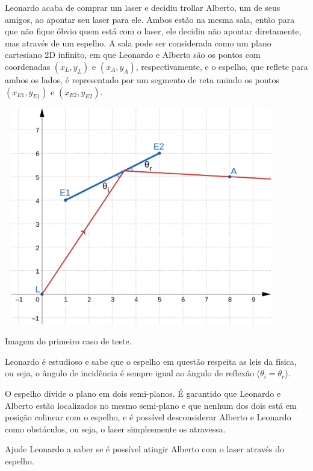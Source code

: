 Leonardo acaba de comprar um laser e decidiu trollar Alberto, um de seus amigos, ao apontar seu laser para ele. Ambos estão na mesma sala, então para que não fique óbvio quem está com o laser, ele decidiu não apontar diretamente, mas através de um espelho. A sala pode ser considerada como um plano cartesiano 2D infinito, em que Leonardo e Alberto são os pontos com coordenadas $(x_L, y_L)$ e $(x_A, y_A)$, respectivamente, e o espelho, que reflete para ambos os lados, é representado por um segmento de reta unindo os pontos $(x_{E1}, y_{E1})$ e $(x_{E2}, y_{E2})$.

\begin{center}
\includegraphics[width=12.0cm, height=9.5cm]{Teste1.png}

Imagem do primeiro caso de teste.
\end{center}

Leonardo é estudioso e sabe que o espelho em questão respeita as leis da física, ou seja, o ângulo de incidência é sempre igual ao ângulo de reflexão ($\theta_i = \theta_r$).

O espelho divide o plano em dois semi-planos. É garantido que Leonardo e Alberto estão localizados no mesmo semi-plano e que nenhum dos dois está em posição colinear com o espelho, e é possível desconsiderar Alberto e Leonardo como obstáculos, ou seja, o laser simplesmente os atravessa.

Ajude Leonardo a saber se é possível atingir Alberto com o laser através do espelho.